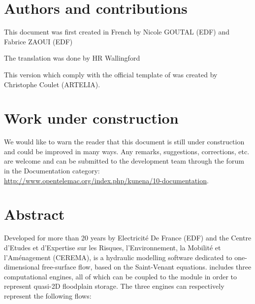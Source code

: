 \documentclass[Mascaret]{../../data/TelemacDoc} %
\begin{document}
\let\cleardoublepage\clearpage
\title{\mascaret}
\subtitle{Theory guide}
\version{\telmaversion}
\date{\today}
\maketitle
\clearpage


\newpage

\thispagestyle{empty}

\chapter*{Authors and contributions}
This document was first created in French by Nicole GOUTAL (EDF) and Fabrice ZAOUI (EDF)

The translation was done by HR Wallingford

This version which comply with the official template of \telemacsystem{} was created by Christophe Coulet (ARTELIA).

\newpage

\chapter*{Work under construction}\label{workunderconstruction}
We would like to warn the reader that this document is still under construction
and could be improved in many ways. Any remarks, suggestions, corrections, etc.
are welcome and can be submitted to the \telemacsystem development team through
the forum in the Documentation category:
\url{http://www.opentelemac.org/index.php/kunena/10-documentation}.

\newpage

\chapter*{Abstract}\label{Abstract}
Developed for more than 20 years by Electricité De France (EDF) and the Centre d'Etudes et d'Expertise sur les Risques, l'Environnement, la Mobilité et l'Aménagement (CEREMA), \mascaret{} is a hydraulic modelling software dedicated to one-dimensional free-surface flow, based on the Saint-Venant equations.
\mascaret{} includes three computational engines, all of which can be coupled to the \casier{} module in order to represent quasi-2D floodplain storage. The three engines can respectively represent the following flows:
\end{document}
